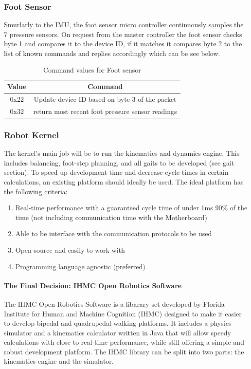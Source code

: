 \subsubsection{Foot Sensor}
Smurlarly to the IMU, the foot sensor micro controller continuously samples the 7 pressure sensors. On request from the master controller the foot sensor checks byte 1 and compares it to the device ID, if it matches it compares byte 2 to the list of known commands and replies accordingly which can be see below.
\begin{table}[H]
        \centering
        \begin{tabular}{|c|c|}
        \hline
            Value & Command \\
            \hline
            0x22 & Update device ID based on byte 3 of the packet\\
            0x32 & return most recent foot pressure sensor readings\\
            \hline
            \end{tabular}
        \caption{Command values for Foot sensor}
        \label{tab:my_label}
    \end{table}

\subsubsection{Robot Kernel}
The kernel's main job will be to run the kinematics and dynamics engine. This includes balancing, foot-step planning, and all gaits to be developed (see gait section). To speed up development time and decrease cycle-times in certain calculations, an existing platform should ideally be used. The ideal platform has the following criteria:
\begin{enumerate}
    \item Real-time performance with a guaranteed cycle time of under 1ms 90\% of the time (not including communication time with the Motherboard)
    \item Able to be interface with the communication protocols to be used
    \item Open-source and easily to work with
    \item Programming language agnostic (preferred)
\end{enumerate}

\paragraph*{The Final Decision: IHMC Open Robotics Software}
The IHMC Open Robotics Software is a libarary set developed by Florida Institute for Human and Machine Cognition (IHMC) designed to make it easier to develop bipedal and quadrupedal walking platforms. It includes a physics simulator and a kinematics calculator written in Java that will allow speedy calculations with close to real-time performance, while still offering a simple and robust development platform. The IHMC library can be split into two parts: the kinematics engine and the simulator.

